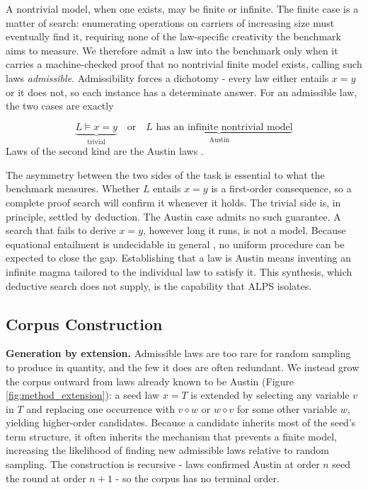 \documentclass[letterpaper]{article} %
\newcommand{\op}{\diamond}
\begin{document}
A nontrivial model, when one exists, may be finite or infinite. The finite case is a matter of search: enumerating operations on carriers of increasing size must eventually find it, requiring none of the law-specific creativity the benchmark aims to measure. We therefore admit a law into the benchmark only when it carries a machine-checked proof that no nontrivial finite model exists, calling such laws \textit{admissible}. Admissibility forces a dichotomy - every law either entails $x=y$ or it does not, so each instance has a determinate answer. For an admissible law, the two cases are exactly

\begin{equation}
    \label{eq:dichotomy}
    \underbrace{L \models x = y}_{\text{trivial}}
    \quad\text{or}\quad
    \underbrace{L \text{ has an infinite nontrivial model}}_{\text{Austin}}
\end{equation}
Laws of the second kind are the Austin laws \citep{kisielewicz1997austin}.

The asymmetry between the two sides of the task is essential to what the benchmark measures. Whether $L$ entails $x = y$ is a first-order consequence, so a complete proof search will confirm it whenever it holds. The trivial side is, in principle, settled by deduction. The Austin case admits no such guarantee. A search that fails to derive $x = y$, however long it runs, is not a model. Because equational entailment is undecidable in general \citep{baader1998term}, no uniform procedure can be expected to close the gap. Establishing that a law is Austin means inventing an infinite magma tailored to the individual law to satisfy it. This synthesis, which deductive search does not supply, is the capability that ALPS isolates. 


\subsection{Corpus Construction}
\textbf{Generation by extension.} Admissible laws are too rare for random sampling to produce in quantity, and the few it does are often redundant. We instead grow the corpus outward from laws already known to be Austin (Figure \ref{fig:method_extension}): a seed law $x = T$ is extended by selecting any variable $v$ in $T$ and replacing one occurrence with $v \op w$ or $w \op v$ for some other variable $w$, yielding higher-order candidates. Because a candidate inherits most of the seed's term structure, it often inherits the mechanism that prevents a finite model, increasing the likelihood of finding new admissible laws relative to random sampling. The construction is recursive - laws confirmed Austin at order $n$ seed the round at order $n+1$ - so the corpus has no terminal order. 
\end{document}
